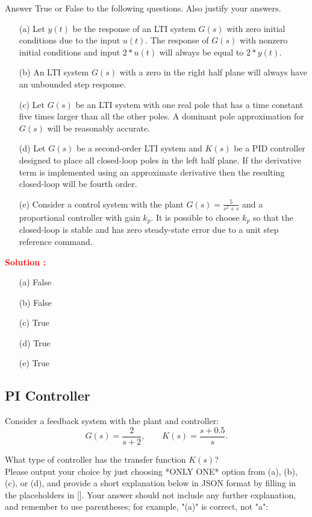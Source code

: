 \documentclass[12pt]{article}
\begin{document}
Answer True or False to the following questions. Also justify your answers.
\begin{itemize}
    \item[(a)] Let \(y(t)\) be the response of an LTI system \(G(s)\) with zero initial conditions due to the input \(u(t)\). The response of \(G(s)\) with nonzero initial conditions and input \(2*u(t)\) will always be equal to \(2*y(t)\).
    \item[(b)] An LTI system \(G(s)\) with a zero in the right half plane will always have an unbounded step response.
    \item[(c)] Let \(G(s)\) be an LTI system with one real pole that has a time constant five times larger than all the other poles. A dominant pole approximation for \(G(s)\) will be reasonably accurate.
    \item[(d)]Let \(G(s)\) be a second-order LTI system and \(K(s)\) be a PID controller designed to place all closed-loop poles in the left half plane. If the derivative term is implemented using an approximate derivative then the resulting closed-loop will be fourth order.
    \item[(e)] Consider a control system with the plant \(G(s) = \frac{5}{s^2+s}\) and a proportional controller with gain \(k_p\). It is possible to choose \(k_p\) so that the closed-loop is stable and has zero steady-state error due to a unit step reference command.
\end{itemize}



\textbf{\textcolor{red}{Solution :}} \\
\begin{itemize}
    \item[(a)] False
    \item[(b)] False
    \item[(c)] True
    \item[(d)] True
    \item[(e)] True
\end{itemize}
\clearpage

\subsection{PI Controller}

Consider a feedback system with the plant and controller:
$$G(s) = \frac{2}{s+2}, \qquad K(s) = \frac{s+0.5}{s}.$$

 What type of controller has the transfer function $K(s)$?\\
 Please output your choice by just choosing *ONLY ONE* option from (a), (b), (c), or (d), and provide a short explanation below in JSON format by filling in the placeholders in []. Your answer should not include any further explanation, and remember to use parentheses; for example, "(a)" is correct, not "a":
\end{document}
